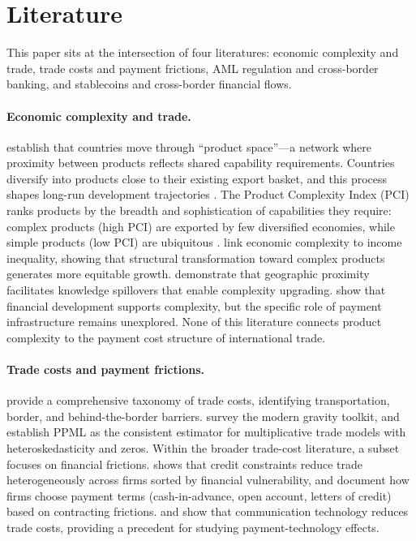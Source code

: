 \section{Literature}
\label{sec:literature}

This paper sits at the intersection of four literatures: economic complexity and trade, trade costs and payment frictions, AML regulation and cross-border banking, and stablecoins and cross-border financial flows.

\paragraph{Economic complexity and trade.}
\citet{Hidalgo2007_product_space} establish that countries move through ``product space''---a network where proximity between products reflects shared capability requirements. Countries diversify into products close to their existing export basket, and this process shapes long-run development trajectories \citep{Hidalgo2009_building_blocks, Hausmann2014_atlas}. The Product Complexity Index (PCI) ranks products by the breadth and sophistication of capabilities they require: complex products (high PCI) are exported by few diversified economies, while simple products (low PCI) are ubiquitous \citep{Hidalgo2021_economic_complexity}. \citet{Hartmann2017_complexity_inequality} link economic complexity to income inequality, showing that structural transformation toward complex products generates more equitable growth. \citet{Bahar2014_neighbors} demonstrate that geographic proximity facilitates knowledge spillovers that enable complexity upgrading. \citet{Ndoya2024_financial_complexity} show that financial development supports complexity, but the specific role of payment infrastructure remains unexplored. None of this literature connects product complexity to the payment cost structure of international trade.

\paragraph{Trade costs and payment frictions.}
\citet{Anderson2004_trade_costs} provide a comprehensive taxonomy of trade costs, identifying transportation, border, and behind-the-border barriers. \citet{Head2014_gravity} survey the modern gravity toolkit, and \citet{SantosSilva2006_ppml} establish PPML as the consistent estimator for multiplicative trade models with heteroskedasticity and zeros. Within the broader trade-cost literature, a subset focuses on financial frictions. \citet{Manova2013_credit_constraints} shows that credit constraints reduce trade heterogeneously across firms sorted by financial vulnerability, and \citet{AntrasFolley2015_trade_finance} document how firms choose payment terms (cash-in-advance, open account, letters of credit) based on contracting frictions. \citet{Freund2004_internet_trade} and \citet{Fink2005_communication} show that communication technology reduces trade costs, providing a precedent for studying payment-technology effects.


